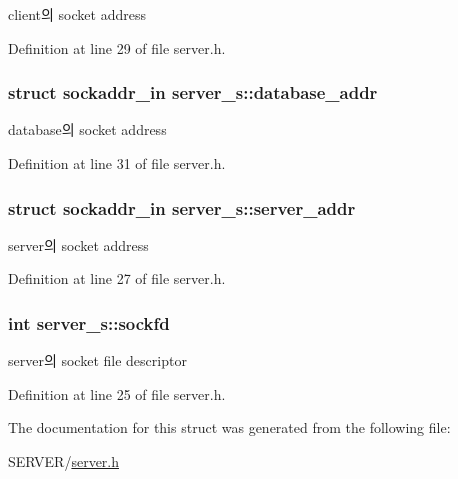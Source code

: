 client의 socket address 



Definition at line 29 of file server.\-h.

\hypertarget{structserver__s_aa4bdd0e294e21fe34f1c9b6e30ee4904}{
\subsubsection[{database\-\_\-addr}]{\setlength{\rightskip}{0pt plus 5cm}struct sockaddr\-\_\-in server\-\_\-s\-::database\-\_\-addr}}\label{structserver__s_aa4bdd0e294e21fe34f1c9b6e30ee4904}


database의 socket address 



Definition at line 31 of file server.\-h.

\hypertarget{structserver__s_aa49ed3594b99b1da4de179995dfa553d}{
\subsubsection[{server\-\_\-addr}]{\setlength{\rightskip}{0pt plus 5cm}struct sockaddr\-\_\-in server\-\_\-s\-::server\-\_\-addr}}\label{structserver__s_aa49ed3594b99b1da4de179995dfa553d}


server의 socket address 



Definition at line 27 of file server.\-h.

\hypertarget{structserver__s_a7109ed4db0376f7de840d82c4379099d}{
\subsubsection[{sockfd}]{\setlength{\rightskip}{0pt plus 5cm}int server\-\_\-s\-::sockfd}}\label{structserver__s_a7109ed4db0376f7de840d82c4379099d}


server의 socket file descriptor 



Definition at line 25 of file server.\-h.



The documentation for this struct was generated from the following file\-:\begin{DoxyCompactItemize}
\item 
S\-E\-R\-V\-E\-R/\hyperlink{server_8h}{server.\-h}\end{DoxyCompactItemize}
